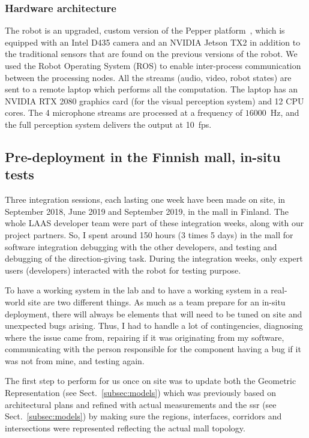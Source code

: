 \documentclass[a4paper,11pt,twoside]{StyleThese}
\begin{document}
\subsubsection{Hardware architecture}\label{subsec:hw}
The robot is an upgraded, custom version of the Pepper platform~\cite{caniot_adapted_2020}, which is equipped with an Intel D435 camera and an NVIDIA Jetson TX2 in addition to the traditional sensors that are found on the previous versions of the robot. We used the Robot Operating System (ROS) to enable inter-process communication between the processing nodes. All the streams (audio, video, robot states) are sent to a remote laptop which performs all the computation. The laptop has an NVIDIA RTX 2080 graphics card (for the visual perception system) and 12 CPU cores. The 4 microphone streams are processed at a frequency of $16000$~Hz, and the full perception system delivers the output at 10~fps.

\subsection{Pre-deployment in the Finnish mall, in-situ tests}\label{subsec:tests_mall}

Three integration sessions, each lasting one week have been made on site, in September 2018, June 2019 and September 2019, in the mall in Finland. The whole LAAS developer team were part of these integration weeks, along with our project partners. So, I spent around 150 hours (3 times 5 days) in the mall for software integration debugging with the other developers, and testing and debugging of the direction-giving task. 
During the integration weeks, only expert users (developers) interacted with the robot for testing purpose. 

To have a working system in the lab and to have a working system in a real-world site are two different things. As much as a team prepare for an in-situ deployment, there will always be elements that will need to be tuned on site and unexpected bugs arising. Thus, I had to handle a lot of contingencies, diagnosing where the issue came from, repairing if it was originating from my software, communicating with the person responsible for the component having a bug if it was not from mine, and testing again.

The first step to perform for us once on site was to update both the Geometric Representation (see Sect.~\ref{subsec:models}) which was previously based on architectural plans and refined with actual measurements and the \acrlong{ssr} (see Sect.~\ref{subsec:models}) by making sure the regions, interfaces, corridors and intersections were represented reflecting the actual mall topology. 
\end{document}
